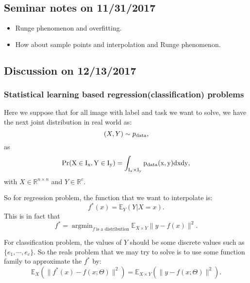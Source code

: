 \subsection{Seminar notes on 11/31/2017}
\begin{itemize}
\item Runge phenomenon and overfitting. 
\item How about sample points and interpolation and Runge phenomenon.
\end{itemize}

\subsection{Discussion on 12/13/2017}
\subsubsection{Statistical learning based regression(classification)
  problems}

Here we suppose that for all image with label and task we want to solve, we have the next joint distribution in real world as:
\begin{equation}\label{eq:jointdit}
(X,Y) \sim p_{\rm data},
\end{equation}
as 
\begin{equation}\label{eq:defPr}
\rm{Pr}(X \in I_x, Y \in I_y) = \int_{I_x \times I_y}p_{\rm data}(x,y)dxdy,
\end{equation}
with $X \in \mathbb{R}^{n\times n}$ and $Y \in \mathbb{R}^c$.

So for regression problem, the function that we want to interpolate is:
\begin{equation}\label{eq:deff}
f^*(x) = \mathbb{E}_Y (Y | X = x).
\end{equation}
This is in fact that 
\begin{equation}\label{eq:f*}
f^* = \mathop{\arg\min}_{f ~\text{is a distribution}}\mathbb{E}_{X\times Y} \|y - f(x)\|^2.
\end{equation}

For classification problem, the values of $Y$ should be some discrete values such as $\{e_1, \cdots, e_c\}$. So the reals problem that we may try to solve is to use some function family to approximate the $f^*$ by:
\begin{equation}\label{eq:stat_opt}
\mathbb{E}_{X} (\|f^*(x) - f(x;\Theta)\|^2) = \mathbb{E}_{X\times Y}(\|y - f(x;\Theta)\|^2).
\end{equation}

